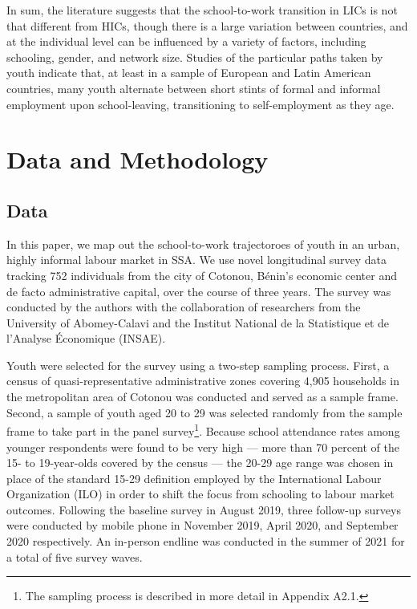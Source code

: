 \documentclass[
  a4paper, twoside, 12pt]{book}
\begin{document}
In sum, the literature suggests that the school-to-work transition in LICs is not that different from HICs, though there is a large variation between countries, and at the individual level can be influenced by a variety of factors, including schooling, gender, and network size. Studies of the particular paths taken by youth indicate that, at least in a sample of European and Latin American countries, many youth alternate between short stints of formal and informal employment upon school-leaving, transitioning to self-employment as they age.

\hypertarget{survey-datamethods}{%
\section{Data and Methodology}\label{survey-datamethods}}

\hypertarget{survey-data}{%
\subsection*{Data}\label{survey-data}}

In this paper, we map out the school-to-work trajectoroes of youth in an urban, highly informal labour market in SSA. We use novel longitudinal survey data tracking 752 individuals from the city of Cotonou, Bénin's economic center and de facto administrative capital, over the course of three years. The survey was conducted by the authors with the collaboration of researchers from the University of Abomey-Calavi and the Institut National de la Statistique et de l'Analyse Économique (INSAE).

Youth were selected for the survey using a two-step sampling process. First, a census of quasi-representative administrative zones covering 4,905 households in the metropolitan area of Cotonou was conducted and served as a sample frame. Second, a sample of youth aged 20 to 29 was selected randomly from the sample frame to take part in the panel survey\footnote{The sampling process is described in more detail in Appendix A2.1.}. Because school attendance rates among younger respondents were found to be very high --- more than 70 percent of the 15- to 19-year-olds covered by the census --- the 20-29 age range was chosen in place of the standard 15-29 definition employed by the International Labour Organization (ILO) in order to shift the focus from schooling to labour market outcomes. Following the baseline survey in August 2019, three follow-up surveys were conducted by mobile phone in November 2019, April 2020, and September 2020 respectively. An in-person endline was conducted in the summer of 2021 for a total of five survey waves.
\end{document}
